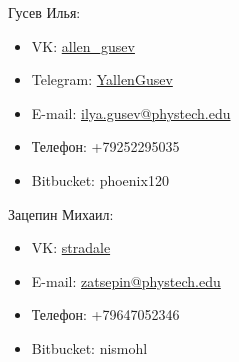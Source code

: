 \documentclass[10pt]{beamer}
\title[\href{https://goo.gl/NRgp8K}{https://goo.gl/NRgp8K} (Term 3)]{}
\date{Москва, 2017}
\begin{document}
\begin{frame}
\begin{multicols}{2}
Гусев Илья:
\begin{itemize}
      \item VK: \href{https://vk.com/allen_gusev}{allen\_gusev}
      \item Telegram: \href{https://t.me/YallenGusev}{YallenGusev}
      \item E-mail: \href{mailto:ilya.gusev@phystech.edu}{ilya.gusev@phystech.edu}
      \item Телефон: +79252295035
      \item Bitbucket: phoenix120
  \end{itemize}
\vfill\eject
Зацепин Михаил:
\begin{itemize}
      \item VK: \href{https://vk.com/stradale}{stradale}
      \item E-mail: \href{mailto:zatsepin@phystech.edu}{zatsepin@phystech.edu}
      \item Телефон: +79647052346
      \item Bitbucket: nismohl
  \end{itemize}
\end{multicols}
\end{frame}
\end{document}
